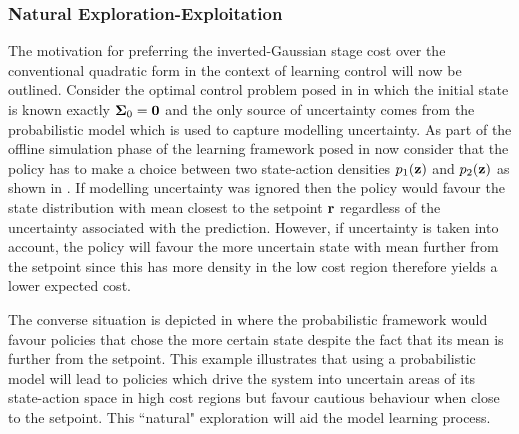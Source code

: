 \subsubsection{Natural Exploration-Exploitation}\label{sec:natexp}
The motivation for preferring the inverted-Gaussian stage cost  over the conventional quadratic form in the context of learning control will now be outlined. Consider the optimal control problem posed in  in which the initial state is known exactly $\boldsymbol{\Sigma}_0 = \mathbf{0}$ and the only source of uncertainty comes from the probabilistic model which is used to capture modelling uncertainty. As part of the offline simulation phase of the learning framework posed in  now consider that the policy has to make a choice between two state-action densities $p_1(\mathbf{z})$ and $p_2(\mathbf{z})$ as shown in . If modelling uncertainty was ignored then the policy would favour the state distribution with mean closest to the setpoint $\mathbf{r}$ regardless of the uncertainty associated with the prediction. However, if uncertainty is taken into account, the policy will favour the more uncertain state with mean further from the setpoint since this has more density in the low cost region therefore yields a lower expected cost. 

The converse situation is depicted in  where the probabilistic framework would favour policies that chose the more certain state despite the fact that its mean is further from the setpoint. 
This example illustrates that using a probabilistic model will lead to policies which drive the system into uncertain areas of its state-action space in high cost regions but favour cautious behaviour when close to the setpoint. This ``natural" exploration will aid the model learning process.



